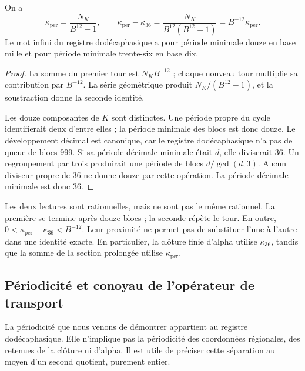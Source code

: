 \begin{proposition}
\label{prop:k-periodo}
On a
\begin{equation}
 \kappa_{\mathrm{per}}=\frac{N_K}{B^{12}-1},\qquad
 \kappa_{\mathrm{per}}-\kappa_{36}
 =\frac{N_K}{B^{12}(B^{12}-1)}
 =B^{-12}\kappa_{\mathrm{per}}.
 \label{eq:k-diferencia-kappas}
\end{equation}
Le mot infini du registre dodécaphasique a pour période minimale douze en base mille et pour période minimale trente-six en base dix.
\end{proposition}

\begin{proof}
La somme du premier tour est \(N_KB^{-12}\) ; chaque nouveau tour
multiplie sa contribution par \(B^{-12}\). La série géométrique produit
\(N_K/(B^{12}-1)\), et la soustraction donne la seconde identité.

Les douze composantes de \(K\) sont distinctes. Une période propre du cycle
identifierait deux d'entre elles ; la période minimale des blocs est donc
douze. Le développement décimal est canonique, car le registre dodécaphasique n'a pas de queue
de blocs 999. Si sa période décimale minimale était \(d\), elle diviserait
36. Un regroupement par trois produirait une période de blocs
\(d/\gcd(d,3)\). Aucun diviseur propre de 36 ne donne douze par cette
opération. La période décimale minimale est donc 36.
\end{proof}

Les deux lectures sont rationnelles, mais ne sont pas le même rationnel. La première se termine après douze blocs ; la seconde répète le tour. En outre, \(0<\kappa_{\mathrm{per}}-\kappa_{36}<B^{-12}\). Leur proximité ne permet pas de substituer l'une à l'autre dans une identité exacte. En particulier, la clôture finie d'alpha utilise \(\kappa_{36}\), tandis que la somme de la section prolongée utilise \(\kappa_{\mathrm{per}}\).



\subsection{Périodicité et conoyau de l'opérateur de transport}
\label{subsec:k-clase-acarreo}

La périodicité que nous venons de démontrer appartient au registre dodécaphasique. Elle n'implique
pas la périodicité des coordonnées régionales, des retenues de la clôture
ni d'alpha. Il est utile de préciser cette séparation au moyen d'un second
quotient, purement entier.

